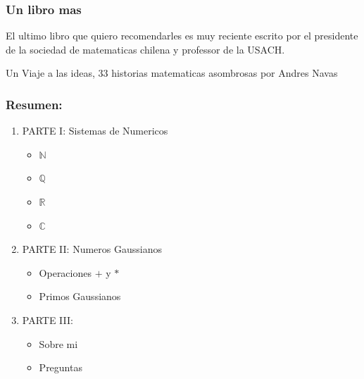\documentclass{beamer}
\def\CC{{\mathbb C}}
\def\NN{{\mathbb N}}
\def\QQ{{\mathbb Q}}
\def\RR{{\mathbb R}}
\theoremstyle{thmstyle}
\theoremstyle{thmstyle}
\theoremstyle{thmstyle}
\theoremstyle{mystyle}
\theoremstyle{qstnstyle}
\begin{document}
\begin{frame}
\frametitle{Un libro mas}

\Large{El ultimo libro que quiero recomendarles es muy reciente escrito por el presidente de la sociedad de matematicas chilena y professor de la USACH.

\vspace{10mm}
Un Viaje a las ideas, 33 historias matematicas asombrosas por Andres Navas}

\end{frame}


\begin{frame}
\frametitle{Resumen:}

\begin{enumerate}
\item PARTE I: Sistemas de Numericos
\begin{itemize}
\item $\NN$
\item $\QQ$
\item $\RR$
\item $\CC$
\end{itemize}

\item PARTE II: Numeros Gaussianos
\begin{itemize}
\item Operaciones $+$ y $*$
\item Primos Gaussianos
\end{itemize}


\item PARTE III: 
\begin{itemize}
\item Sobre mi

\item Preguntas
\end{itemize}
\end{enumerate}
\end{frame}
\end{document}
